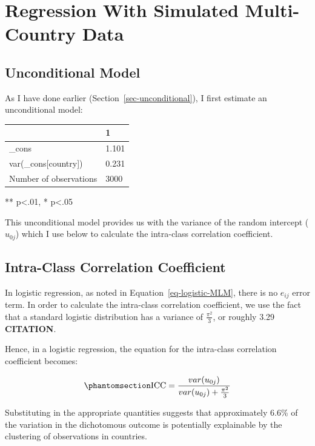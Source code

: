 \documentclass[
  letterpaper,
  DIV=11,
  numbers=noendperiod]{scrreprt}
\begin{document}
\section{Regression With Simulated Multi-Country
Data}\label{sec-logistic-regression}

\subsection{Unconditional Model}\label{unconditional-model-1}

As I have done earlier (Section~\ref{sec-unconditional}), I first
estimate an unconditional model:

\begin{longtable}[]{@{}ll@{}}
\toprule\noalign{}
& 1 \\
\midrule\noalign{}
\endhead
\bottomrule\noalign{}
\endlastfoot
\_cons & 1.101 \\
var(\_cons{[}country{]}) & 0.231 \\
Number of observations & 3000 \\
\end{longtable}

** p\textless.01, * p\textless.05

This unconditional model provides us with the variance of the random
intercept (\(u_{0j}\)) which I use below to calculate the intra-class
correlation coefficient.

\subsection{Intra-Class Correlation
Coefficient}\label{intra-class-correlation-coefficient}

In logistic regression, as noted in Equation~\ref{eq-logistic-MLM},
there is no \(e_{ij}\) error term. In order to calculate the intra-class
correlation coefficient, we use the fact that a standard logistic
distribution has a variance of \(\frac{\pi^2}{3}\), or roughly 3.29
\textbf{CITATION}.

Hence, in a logistic regression, the equation for the intra-class
correlation coefficient becomes:

\begin{equation}\phantomsection\label{eq-ICC-logistic}{\text{ICC} = \frac{var(u_{0j})}{var(u_{0j}) + \frac{\pi^2}{3}}}\end{equation}

Substituting in the appropriate quantities suggests that approximately
6.6\% of the variation in the dichotomous outcome is potentially
explainable by the clustering of observations in countries.
\end{document}
